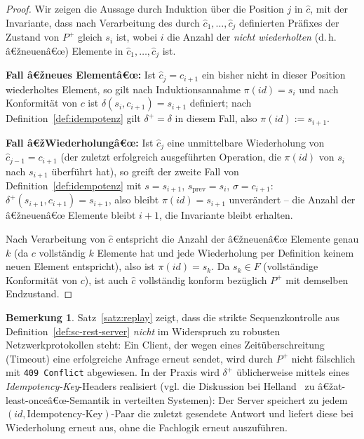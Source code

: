 ﻿\documentclass[a4paper,12pt]{article}
\theoremstyle{definition}
\newtheorem{bemerkung}{Bemerkung}
\begin{document}
\begin{proof}
	Wir zeigen die Aussage durch Induktion über die Position $j$ in $\hat c$, mit der
	Invariante, dass nach Verarbeitung des durch $\hat c_1,\ldots,\hat c_j$ definierten
	Präfixes der Zustand von $P^{+}$ gleich $s_i$ ist, wobei $i$ die Anzahl der
	\emph{nicht wiederholten} (d.\,h. â€žneuenâ€œ) Elemente in $\hat c_1,\ldots,\hat c_j$ ist.

	\textbf{Fall â€žneues Elementâ€œ:} Ist $\hat c_j = c_{i+1}$ ein bisher nicht in dieser
	Position wiederholtes Element, so gilt nach Induktionsannahme
	$\pi(id)=s_i$ und nach Konformität von $c$ ist $\delta(s_i,c_{i+1})=s_{i+1}$
	definiert; nach Definition~\ref{def:idempotenz} gilt $\delta^{+}=\delta$ in diesem
	Fall, also $\pi(id):=s_{i+1}$.

	\textbf{Fall â€žWiederholungâ€œ:} Ist $\hat c_j$ eine unmittelbare Wiederholung von
	$\hat c_{j-1}=c_{i+1}$ (der zuletzt erfolgreich ausgeführten Operation, die
	$\pi(id)$ von $s_i$ nach $s_{i+1}$ überführt hat), so greift der zweite Fall von
	Definition~\ref{def:idempotenz} mit $s=s_{i+1}$, $s_{\mathrm{prev}}=s_i$,
	$\sigma=c_{i+1}$: $\delta^{+}(s_{i+1},c_{i+1})=s_{i+1}$, also bleibt
	$\pi(id)=s_{i+1}$ unverändert -- die Anzahl der â€žneuenâ€œ Elemente bleibt $i+1$, die
	Invariante bleibt erhalten.

	Nach Verarbeitung von $\hat c$ entspricht die Anzahl der â€žneuenâ€œ Elemente genau $k$
	(da $c$ vollständig $k$ Elemente hat und jede Wiederholung per Definition keinem
	neuen Element entspricht), also ist $\pi(id)=s_k$. Da $s_k\in F$ (vollständige
	Konformität von $c$), ist auch $\hat c$ vollständig konform bezüglich $P^{+}$ mit
	demselben Endzustand. \qedhere
\end{proof}

\begin{bemerkung}
	Satz~\ref{satz:replay} zeigt, dass die strikte Sequenzkontrolle aus
	Definition~\ref{def:sc-rest-server} \emph{nicht} im Widerspruch zu robusten
	Netzwerkprotokollen steht: Ein Client, der wegen eines Zeitüberschreitung (Timeout)
	eine erfolgreiche Anfrage erneut sendet, wird durch $P^{+}$ nicht fälschlich mit
	\texttt{409 Conflict} abgewiesen. In der Praxis wird $\delta^{+}$ üblicherweise mittels
	eines \emph{Idempotency-Key}-Headers realisiert (vgl. die Diskussion bei
	Helland~\cite{helland2007} zu â€žat-least-onceâ€œ-Semantik in verteilten Systemen): Der
	Server speichert zu jedem $(id, \text{Idempotency-Key})$-Paar die zuletzt gesendete
	Antwort und liefert diese bei Wiederholung erneut aus, ohne die Fachlogik erneut
	auszuführen.
\end{bemerkung}
\end{document}
